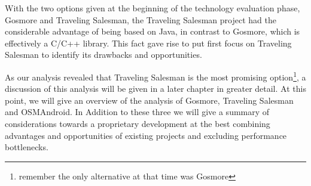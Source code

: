 With the two options given at the beginning of the technology evaluation phase, Gosmore and Traveling Salesman, the Traveling Salesman project had the considerable advantage of being based on Java, in contrast to Gosmore, which is effectively a C/C++ library. This fact gave rise to put first focus on Traveling Salesman to identify its drawbacks and opportunities.\newline

As our analysis revealed that Traveling Salesman is the most promising option\footnote{remember the only alternative at that time was Gosmore}, a discussion of this analysis will be given in a later chapter in greater detail. At this point, we will give an overview of the analysis of Gosmore, Traveling Salesman and OSMAndroid. In Addition to these three we will give a summary of considerations towards a proprietary development at the best combining advantages and opportunities of existing projects and excluding performance bottlenecks.

